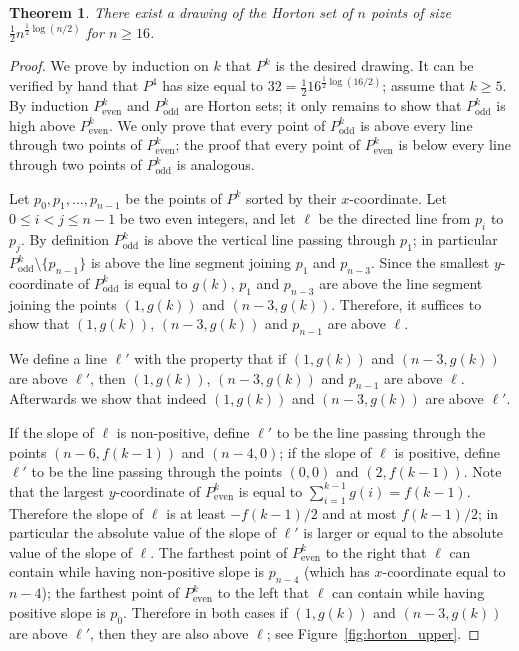 \documentclass{article}
\newtheorem{theorem}{Theorem}[section]
\begin{document}
\begin{theorem}
\label{thm:upper}
There exist a drawing of the Horton set of $n$ points of size $\frac{1}{2} n^{\frac{1}{2} \log (n/2)}$
for $n \ge 16$.
\end{theorem}
\begin{proof}
We prove by induction on $k$ that $P^k$ is the desired drawing.  
It can be verified by hand that $P^4$ has size equal to $32=\frac{1}{2} 16^{\frac{1}{2} \log (16/2)}$; 
assume that $k \ge 5$.
By induction $P_{\textrm{even}}^{k}$ and $P_{\textrm{odd}}^k$ are Horton sets;
it only remains to show that $P_{\textrm{odd}}^k$ is high above $P_{\textrm{even}}^k$.
We only prove that every point of $P_{\textrm{odd}}^k$ is above
every line through two points of $P_{\textrm{even}}^k$;
the proof that every point of $P_{\textrm{even}}^k$ is below
every line through two points of $P_{\textrm{odd}}^k$ is analogous.


Let $p_0, p_1,\dots, p_{n-1}$ be the points of $P^k$ sorted by their
$x$-coordinate. 
Let $0\le i<j \le n-1$ be two even integers, and 
let $\ell$ be the directed line from $p_i$ to $p_j$.  
By definition $P_{\textrm{odd}}^{k}$ is above the vertical line passing through 
$p_1$; in particular $P_{\textrm{odd}}^k\setminus\{ p_{n-1}\}$ is above the line segment
joining $p_1$ and $p_{n-3}$. Since the smallest $y$-coordinate
of $P_{\textrm{odd}}^k$ is equal to $g(k)$,  $p_1$ and $p_{n-3}$ are above the line
segment joining the points $(1,g(k))$ and  $(n-3,g(k))$. 
Therefore, it suffices to show that $(1,g(k))$, $(n-3,g(k))$ and $p_{n-1}$
are above $\ell$. 

We define a line $\ell'$ with the property that if $(1,g(k))$ and  $(n-3,g(k))$
are above $\ell'$, then $(1,g(k))$, $(n-3,g(k))$ and $p_{n-1}$ are above $\ell$.
Afterwards we show that indeed $(1,g(k))$ and  $(n-3,g(k))$ are above $\ell'$.

If the slope of $\ell$ is non-positive, define 
$\ell'$ to be the line passing through the points $(n-6,f(k-1))$ and $(n-4,0)$;
if the slope of $\ell$ is positive, define $\ell'$ to 
be the line passing through the points $(0,0)$ and $(2,f(k-1))$. 
Note that the largest $y$-coordinate of $P_{\textrm{even}}^k$ 
is equal to $\sum_{i=1}^{k-1} g(i)=f(k-1)$. Therefore
the slope of $\ell$ is at least $-f(k-1)/2$ and at most $f(k-1)/2$;
in particular the absolute value of the slope of $\ell'$ is larger or equal
to the absolute value of the slope of $\ell$. 
The farthest point of $P_{\textrm{even}}^k$ to the right that $\ell$ can contain while having non-positive
slope is $p_{n-4}$ (which has $x$-coordinate equal to $n-4$); the farthest point of $P_{\textrm{even}}^k$ to 
the left that $\ell$ can contain while having positive
slope is $p_0$. Therefore in both cases if $(1,g(k))$ and  $(n-3,g(k))$
are above $\ell'$, then they are also above $\ell$; see Figure~\ref{fig:horton_upper}.


\end{proof}
\end{document}
